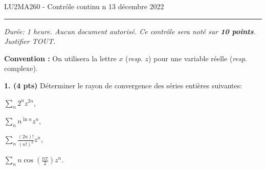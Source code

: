 \documentclass[a4paper,10pt]{article}
\begin{document}
\noindent LU2MA260 - Contrôle continu n
\hfill 13 décembre 2022
\medskip\hrule
\vspace{.3in}

\emph{Durée: 1 heure. Aucun document autorisé.
Ce contrôle sera noté sur \textbf{10 points}. Justifier TOUT.}

\vspace{.1in}
\noindent
\textbf{Convention :}
On utilisera la lettre $x$ (\emph{resp}. $z$) pour une variable réelle (\emph{resp}. complexe).

\vspace{.1in}
\noindent
\textbf{1. (4 pts)}
Déterminer le rayon de convergence des séries entières suivantes:
\begin{enumerate}[label=\alph*)]
\begin{minipage}{0.4\linewidth}
    \item $\sum_n 2^nz^{2n}$,
    \item $\sum_n n^{\ln n}z^n$,
\end{minipage}
\begin{minipage}{0.4\linewidth}
    \item $\sum_n \frac{(2n)!}{(n!)^2}z^n$,
    \item $\sum_n n\cos(\frac{n\pi}{2})z^n$.
\end{minipage}
\end{enumerate}
\end{document}
